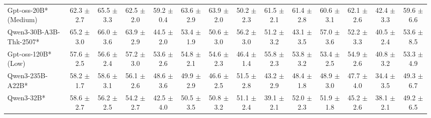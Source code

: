 \begin{table}[hbt]
{\begin{tabular}{l *{13}{c}}

Gpt-oss-20B* (Medium)	&
62.3 {\tiny$\pm$ 2.7}&
65.5 {\tiny$\pm$ 3.3}&
62.5 {\tiny$\pm$ 2.0}&
59.2 {\tiny$\pm$ 0.4}&
63.6 {\tiny$\pm$ 2.9}&
63.9 {\tiny$\pm$ 2.0}&
50.2 {\tiny$\pm$ 2.3}&
61.5 {\tiny$\pm$ 2.1}&
61.4 {\tiny$\pm$ 2.8}&
60.6 {\tiny$\pm$ 3.1}&
62.1 {\tiny$\pm$ 2.6}&
42.4 {\tiny$\pm$ 3.3}&
59.6 {\tiny$\pm$ 6.6} \\		

\rowcolor{gray!10}
Qwen3-30B-A3B-Thk-2507* &
65.2 {\tiny$\pm$ 3.0} &
66.0 {\tiny$\pm$ 3.6} &
63.9 {\tiny$\pm$ 2.9} &
44.5 {\tiny$\pm$ 2.0} &
53.4 {\tiny$\pm$ 1.9} &
50.6 {\tiny$\pm$ 3.0} &
56.2 {\tiny$\pm$ 3.0} &
51.2 {\tiny$\pm$ 3.2} &
43.1 {\tiny$\pm$ 3.5} &
57.0 {\tiny$\pm$ 3.6} &
52.2 {\tiny$\pm$ 3.3} &
40.5 {\tiny$\pm$ 2.4} &
53.6 {\tiny$\pm$ 8.5} \\
 


Gpt-oss-120B* (Low)	&
57.6 {\tiny$\pm$ 2.5}&
56.6 {\tiny$\pm$ 2.4}&
57.2 {\tiny$\pm$ 3.0}&
53.6 {\tiny$\pm$ 2.6}&
54.8 {\tiny$\pm$ 2.1}&
54.6 {\tiny$\pm$ 2.3}&
46.4 {\tiny$\pm$ 1.4}&
55.8 {\tiny$\pm$ 2.3}&
53.8 {\tiny$\pm$ 3.2}&
53.4 {\tiny$\pm$ 2.5}&
54.9 {\tiny$\pm$ 2.6}&
40.8 {\tiny$\pm$ 3.2}&
53.3 {\tiny$\pm$ 4.9}	
\\
\rowcolor{gray!10}
Qwen3-235B-A22B* &
58.2 {\tiny$\pm$ 1.7} &
58.6 {\tiny$\pm$ 3.1} &
56.1 {\tiny$\pm$ 2.6} &
48.6 {\tiny$\pm$ 3.6} &
49.9 {\tiny$\pm$ 2.9} &
46.6 {\tiny$\pm$ 2.5} &
51.5 {\tiny$\pm$ 2.8} &
43.2 {\tiny$\pm$ 2.9} &
48.4 {\tiny$\pm$ 1.8} &
48.9 {\tiny$\pm$ 3.0} &
47.7 {\tiny$\pm$ 4.0} &
34.4 {\tiny$\pm$ 3.5} &
49.3 {\tiny$\pm$ 6.7} \\

Qwen3-32B* &
58.6 {\tiny$\pm$ 2.7} &
56.2 {\tiny$\pm$ 2.5} &
54.2 {\tiny$\pm$ 2.7} &
42.5 {\tiny$\pm$ 4.0} &
50.5 {\tiny$\pm$ 3.5} &
50.8 {\tiny$\pm$ 3.2} &
51.1 {\tiny$\pm$ 2.4} &
39.1 {\tiny$\pm$ 2.1} &
52.0 {\tiny$\pm$ 2.3} &
51.9 {\tiny$\pm$ 1.8} &
45.2 {\tiny$\pm$ 2.6} &
38.1 {\tiny$\pm$ 2.1} &
49.2 {\tiny$\pm$ 6.5} \\



\end{tabular}}
\end{table}
